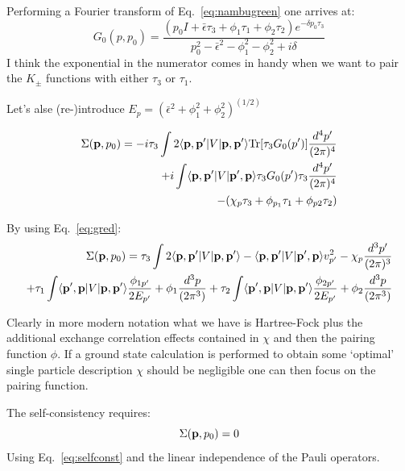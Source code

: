 \documentclass{article}
\def\p{{\bf p}}
\def\bra{\langle}
\def\ket{\rangle}
\begin{document}
Performing a Fourier transform of  Eq.~\ref{eq:nambugreen} one arrives at:
%
\begin{equation}
G_{0}(p,p_{0}) = \frac{(p_{0}I + \bar{\epsilon}\tau_{3} + \phi_{1}\tau_{1} + \phi_{2}\tau_{2}) e^{-\delta p_{0}\tau_{3}}}
{p_{0}^{2} - \bar{\epsilon}^{2} -\phi_{1}^{2} - \phi_{2}^{2} + i\delta}
\end{equation}
%
I think the exponential in the numerator comes in handy when we want to pair the $K_{\pm}$ 
functions with either $\tau_{3}$ or $\tau_{1}$.

Let's alse (re-)introduce $E_{p} = (\bar{\epsilon}^{2} + \phi_{1}^{2} + \phi_{2}^{2})^{(1/2)}$

%
\begin{align}
\Sigma(\p, p_{0}) =  -i\tau_{3}\int 2\bra \p, \p' | V | \p,\p' \ket {\rm Tr}[\tau_{3} G_{0}(p')] \frac{d^{4}p'}{(2\pi)^{4}} \\
   + i \int \bra \p, \p' | V | \p', \p \ket \tau_{3}G_{0}(p') \tau_{3} \frac{d^{4}p'}{(2\pi)^{4}}  \\
   -(\chi_{p} \tau_{3} +\phi_{p_{1}}\tau_{1} + \phi_{p2}\tau_{2})
\end{align}
%

By using Eq.~\ref{eq:gred}:
%
\begin{align}
\Sigma(\p, p_{0}) =  \tau_{3}\int 2\bra\p,\p'|V|\p,\p'\ket - \bra\p,\p'|V|\p',\p\ket v^{2}_{p'} - \chi_{p} \frac{d^{3}p'}{(2\pi)^{3}}\\
							    + \tau_{1} \int \bra\p',\p|V|\p,\p'\ket \frac{\phi_{1p'}}{2E_{p'}} + \phi_{1}  \frac{d^{3}p}{(2\pi^{3})}
							    + \tau_{2} \int \bra\p',\p|V|\p,\p'\ket \frac{\phi_{2p'}}{2E_{p'}} + \phi_{2}  \frac{d^{3}p}{(2\pi^{3})}
\end{align}

Clearly in more modern notation what we have is Hartree-Fock plus the additional 
exchange correlation effects contained in $\chi$ and then the pairing function $\phi$.
If a ground state calculation is performed to obtain some `optimal' single particle
description $\chi$ should be negligible one can then focus on the pairing function.

The self-consistency requires:
%
\begin{equation}
\label{eq:selfconst}
\Sigma(\p,p_{0}) = 0
\end{equation}
%
Using Eq.~\ref{eq:selfconst} and the linear independence of the Pauli operators.
\end{document}
